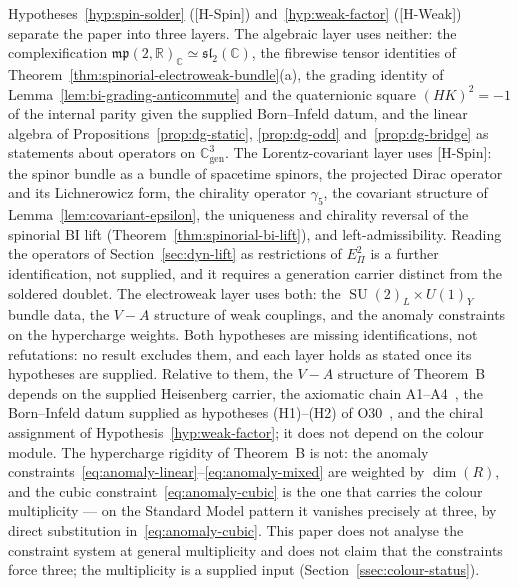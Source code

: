 \documentclass[11pt,a4paper]{article}
\theoremstyle{definition}
\theoremstyle{remark}
\newcommand{\SU}{\operatorname{SU}}
\begin{document}
    Hypotheses~\ref{hyp:spin-solder} ([H-Spin]) and~\ref{hyp:weak-factor} ([H-Weak]) separate the paper
    into three layers.
    The algebraic layer uses neither: the complexification
    $\mathfrak{mp}(2,\mathbb{R})_{\mathbb{C}} \simeq \mathfrak{sl}_2(\mathbb{C})$, the fibrewise tensor
    identities of Theorem~\ref{thm:spinorial-electroweak-bundle}(a), the grading identity of
    Lemma~\ref{lem:bi-grading-anticommute} and the quaternionic square $(HK)^2 = -1$ of the internal
    parity given the supplied Born--Infeld datum, and the linear algebra of
    Propositions~\ref{prop:dg-static}, \ref{prop:dg-odd} and~\ref{prop:dg-bridge} as statements about
    operators on $\mathbb{C}^3_{\mathrm{gen}}$.
    The Lorentz-covariant layer uses [H-Spin]: the spinor bundle as a bundle of spacetime spinors, the
    projected Dirac operator and its Lichnerowicz form, the chirality operator $\gamma_5$, the
    covariant structure of Lemma~\ref{lem:covariant-epsilon}, the uniqueness and chirality reversal
    of the spinorial BI lift (Theorem~\ref{thm:spinorial-bi-lift}), and left-admissibility.
    Reading the operators of Section~\ref{sec:dyn-lift} as restrictions of $E_\Pi^2$ is a further
    identification, not supplied, and it requires a generation carrier distinct from the soldered doublet.
    The electroweak layer uses both: the $\SU(2)_L \times U(1)_Y$ bundle data, the $V{-}A$ structure of
    weak couplings, and the anomaly constraints on the hypercharge weights.
    Both hypotheses are missing identifications, not refutations: no result excludes them, and each
    layer holds as stated once its hypotheses are supplied.
    Relative to them, the $V{-}A$ structure of Theorem~B depends on the supplied Heisenberg carrier,
    the axiomatic chain A1--A4~\cite{Beau2026m}, the Born--Infeld datum supplied as hypotheses
    (H1)--(H2) of O30~\cite{Beau2026a34}, and the chiral assignment of
    Hypothesis~\ref{hyp:weak-factor}; it does not depend on the colour module.
    The hypercharge rigidity of Theorem~B is not: the anomaly
    constraints~\eqref{eq:anomaly-linear}--\eqref{eq:anomaly-mixed} are weighted by $\dim(R)$, and
    the cubic constraint~\eqref{eq:anomaly-cubic} is the one that carries the colour multiplicity
    --- on the Standard Model pattern it vanishes precisely at three, by direct substitution
    in~\eqref{eq:anomaly-cubic}.
    This paper does not analyse the constraint system at general multiplicity and does not claim
    that the constraints force three; the multiplicity is a supplied input
    (Section~\ref{ssec:colour-status}).
\end{document}
